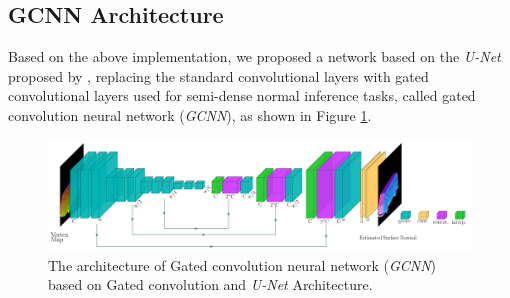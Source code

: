 
\subsection{GCNN Architecture}
\label{sec:architecture}

Based on the above implementation, we proposed a network based on the \textit{U-Net} proposed by \cite{unet}, replacing the standard convolutional layers with gated convolutional layers used for semi-dense normal inference tasks, called gated convolution neural network (\textit{GCNN}), as shown in Figure \ref{fig:gcnn-archi}. 

\begin{figure}
	\centering
	\captionsetup{width=\linewidth}
	\includegraphics[width=\textwidth]{Figures/gcnn}
	\decoRule
	\caption{The architecture of Gated convolution neural network (\textit{GCNN}) based on Gated convolution and \textit{U-Net} Architecture.}
	\label{fig:gcnn-archi}
\end{figure}

